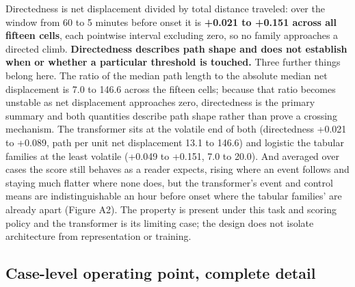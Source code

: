 \vspace{0.8em}

Directedness is net displacement divided by total distance traveled: over the window from 60 to 5
minutes before onset it is \textbf{+0.021 to +0.151 across all fifteen cells}, each pointwise interval
excluding zero, so no family approaches a directed climb. \textbf{Directedness describes path shape and does not
establish when or whether a particular threshold is touched.} Three further things belong here. The ratio of the median path length to the absolute median net displacement is 7.0 to
146.6 across the fifteen cells; because that ratio becomes unstable as net displacement
approaches zero, directedness is the primary summary and both quantities describe path shape
rather than prove a crossing mechanism. The transformer sits at the volatile end of both
(directedness +0.021 to +0.089, path per unit net displacement 13.1 to 146.6) and logistic
the tabular families at the least volatile (+0.049 to +0.151, 7.0 to 20.0). And averaged over cases the
score still behaves as a reader expects, rising where an event follows and staying much flatter
where none does, but the transformer's event and control means are indistinguishable an hour
before onset where the tabular families' are already apart (Figure A2). The property is present
under this task and scoring policy and the transformer is its limiting case; the design does not
isolate architecture from representation or training.

\subsection{Case-level operating point, complete detail}\label{case-level-operating-point-complete-detail}

